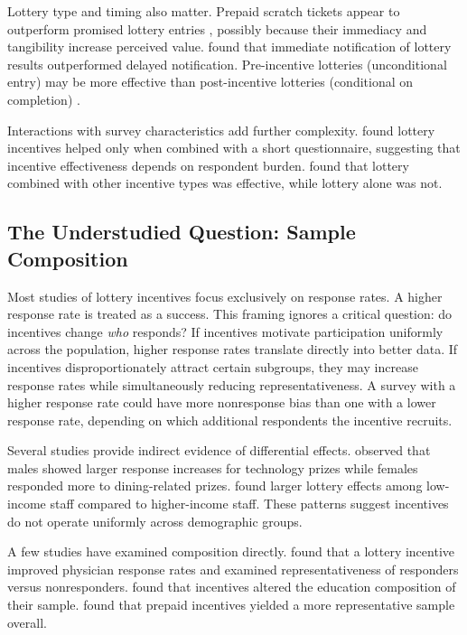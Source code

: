 Lottery type and timing also matter. Prepaid scratch tickets appear to outperform
promised lottery entries \parencite{Olsen.etal2012, Guo.etal2016}, possibly because their
immediacy and tangibility increase perceived value. \textcite{Tuten.etal2004a} found that
immediate notification of lottery results outperformed delayed notification.
Pre-incentive lotteries (unconditional entry) may be more effective than post-incentive
lotteries (conditional on completion) \parencite{Sanchez-Fernandez.etal2010a}.

Interactions with survey characteristics add further complexity. \textcite{Spry.etal1989}
found lottery incentives helped only when combined with a short questionnaire, suggesting
that incentive effectiveness depends on respondent burden. \textcite{Cobanoglu.Cobanoglu2003} found
that lottery combined with other incentive types was effective, while lottery alone was
not.

\subsection{The Understudied Question: Sample Composition}

Most studies of lottery incentives focus exclusively on response rates. A higher response
rate is treated as a success. This framing ignores a critical question: do incentives
change \emph{who} responds? If incentives motivate participation uniformly across the
population, higher response rates translate directly into better data. If incentives
disproportionately attract certain subgroups, they may increase response rates while
simultaneously reducing representativeness. A survey with a higher response rate could
have more nonresponse bias than one with a lower response rate, depending on which
additional respondents the incentive recruits.

Several studies provide indirect evidence of differential effects. \textcite{Laguilles.etal2011a}
observed that males showed larger response increases for technology prizes while females
responded more to dining-related prizes. \textcite{Zhang.etal2017a} found larger lottery
effects among low-income staff compared to higher-income staff. These patterns suggest
incentives do not operate uniformly across demographic groups.

A few studies have examined composition directly. \textcite{Robertson.etal2005} found that a
lottery incentive improved physician response rates and examined representativeness of
responders versus nonresponders. \textcite{Petrolia.Bhattacharjee2009a} found that incentives altered
the education composition of their sample. \textcite{Goyder1994} found that prepaid
incentives yielded a more representative sample overall.

